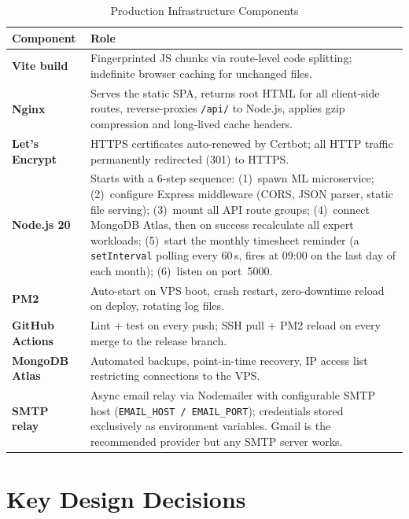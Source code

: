 \documentclass[12pt,a4paper]{report}
\begin{document}
\begin{longtable}{>{\bfseries}p{3cm} p{10.5cm}}
  \caption{Production Infrastructure Components}\label{tab:infra}\\
  \toprule Component & Role\\\midrule\endhead
  Vite build   & Fingerprinted JS chunks via route-level code splitting; indefinite browser caching for unchanged files.\\
  Nginx        & Serves the static SPA, returns root HTML for all client-side routes, reverse-proxies \texttt{/api/} to Node.js, applies gzip compression and long-lived cache headers.\\
  Let's Encrypt & HTTPS certificates auto-renewed by Certbot; all HTTP traffic permanently redirected (301) to HTTPS.\\
  Node.js 20   & Starts with a 6-step sequence: (1)~spawn ML microservice; (2)~configure Express middleware (CORS, JSON parser, static file serving); (3)~mount all API route groups; (4)~connect MongoDB Atlas, then on success recalculate all expert workloads; (5)~start the monthly timesheet reminder (a \texttt{setInterval} polling every 60\,s, fires at 09:00 on the last day of each month); (6)~listen on port~5000.\\
  PM2          & Auto-start on VPS boot, crash restart, zero-downtime reload on deploy, rotating log files.\\
  GitHub Actions & Lint + test on every push; SSH pull + PM2 reload on every merge to the release branch.\\
  MongoDB Atlas & Automated backups, point-in-time recovery, IP access list restricting connections to the VPS.\\
  SMTP relay   & Async email relay via Nodemailer with configurable SMTP host (\texttt{EMAIL\_HOST / EMAIL\_PORT}); credentials stored exclusively as environment variables. Gmail is the recommended provider but any SMTP server works.\\
  \bottomrule
\end{longtable}

\section{Key Design Decisions}
\end{document}
